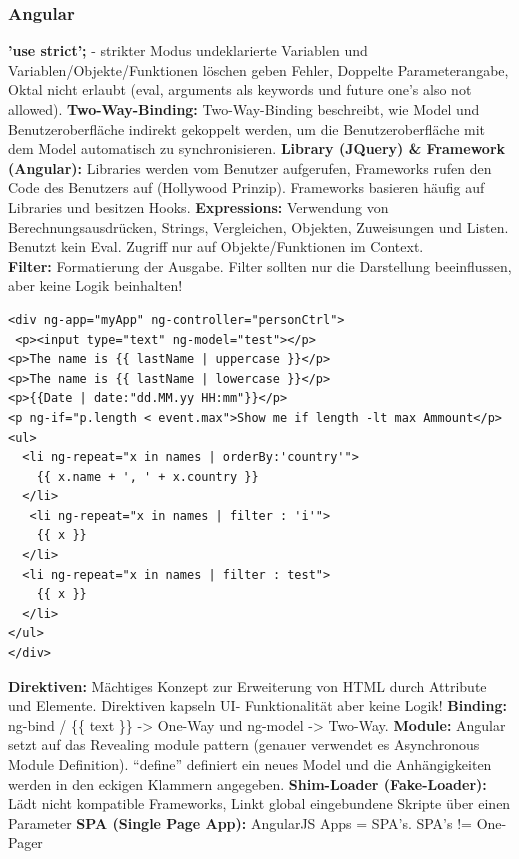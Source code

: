 \begin{multicols*}{4}
\subsubsection{Angular}
\textbf{\color{NavyBlue}'use strict';} - strikter Modus undeklarierte Variablen
 und Variablen/Objekte/Funktionen löschen geben Fehler, Doppelte 
 Parameterangabe, Oktal nicht erlaubt (eval, arguments als keywords und future one's also not allowed).
\textbf{\color{NavyBlue}Two-Way-Binding:} Two-Way-Binding beschreibt, wie Model und 
Benutzeroberfläche indirekt 
gekoppelt werden, um die 
Benutzeroberfläche mit dem Model automatisch zu synchronisieren.
\textbf{\color{NavyBlue}Library (JQuery) \& Framework
(Angular):} Libraries werden vom
Benutzer aufgerufen, Frameworks
rufen den Code des Benutzers auf
(Hollywood Prinzip). Frameworks
basieren häufig auf Libraries und besitzen Hooks.
\textbf{\color{NavyBlue}Expressions:} Verwendung von Berechnungsausdrücken, Strings, Vergleichen, Objekten, 
Zuweisungen und Listen. Benutzt kein Eval. Zugriff nur auf Objekte/Funktionen im 
Context.\\
\textbf{\color{NavyBlue}Filter:}
Formatierung der Ausgabe.
Filter sollten nur die Darstellung beeinflussen, aber
keine Logik beinhalten!
\begin{verbatim}
<div ng-app="myApp" ng-controller="personCtrl">
 <p><input type="text" ng-model="test"></p>
<p>The name is {{ lastName | uppercase }}</p>
<p>The name is {{ lastName | lowercase }}</p>
<p>{{Date | date:"dd.MM.yy HH:mm"}}</p>
<p ng-if="p.length < event.max">Show me if length -lt max Ammount</p>
<ul>
  <li ng-repeat="x in names | orderBy:'country'">
    {{ x.name + ', ' + x.country }}
  </li>
   <li ng-repeat="x in names | filter : 'i'">
    {{ x }}
  </li>
  <li ng-repeat="x in names | filter : test">
    {{ x }}
  </li>
</ul>
</div> 
\end{verbatim}
\textbf{\color{NavyBlue}Direktiven:} Mächtiges
Konzept zur Erweiterung von HTML durch Attribute und Elemente. Direktiven kapseln 
UI- Funktionalität aber keine Logik!
\textbf{\color{NavyBlue}Binding:} ng-bind / \{\{ text \}\} -> One-Way und ng-model -> Two-Way.
\textbf{\color{NavyBlue}Module:} Angular setzt auf das Revealing module
pattern (genauer verwendet es Asynchronous Module
Definition). “define” definiert ein neues Model und die Anhängigkeiten 
werden in den eckigen Klammern angegeben.
\textbf{\color{NavyBlue}Shim-Loader (Fake-Loader):} Lädt nicht kompatible
Frameworks, Linkt global eingebundene Skripte über
einen Parameter
\textbf{\color{NavyBlue}SPA (Single Page App):} AngularJS Apps = SPA’s. SPA’s != One-Pager 

\end{multicols*}
